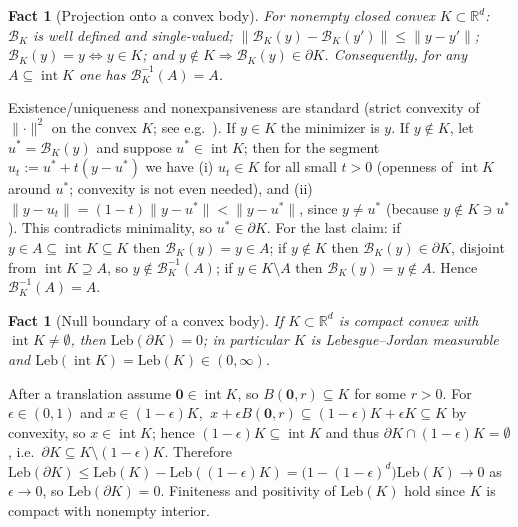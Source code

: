\documentclass[11pt]{article}
\makeatletter
\theoremstyle{definitionbreak}
\theoremstyle{plainbreak}
\newtheorem{fact}[theorem]{Fact}
\theoremstyle{remarkbreak}
\renewenvironment{proof}[1][\proofname]{\par
  \pushQED{\qed}\normalfont
  \topsep6\p@\@plus6\p@\relax
  \trivlist
  \item[\hskip\labelsep\itshape #1\@addpunct{.}]\mbox{}\par\nobreak\ignorespaces
}{\popQED\endtrivlist\@endpefalse}
\newcommand{\R}{\mathbb{R}}
\newcommand{\Leb}{\mathrm{Leb}}
\DeclareMathOperator{\intr}{int}
\newcommand{\norm}[1]{\lVert #1 \rVert}
\makeatother
\begin{document}
\begin{fact}[Projection onto a convex body]
\label{fact:proj}
For nonempty closed convex $K\subset\R^d$: $\mathcal B_K$ is well defined and single-valued;
$\norm{\mathcal B_K(y)-\mathcal B_K(y')}\le\norm{y-y'}$; $\mathcal B_K(y)=y\iff y\in K$; and
$y\notin K\Rightarrow\mathcal B_K(y)\in\partial K$. Consequently, for any $A\subseteq\intr K$ one has
$\mathcal B_K^{-1}(A)=A$.
\end{fact}
\begin{proof}
Existence/uniqueness and nonexpansiveness are standard (strict convexity of $\norm{\cdot}^2$ on the
convex $K$; see e.g.\ \cite[Ch.~III]{HiriartLemarechal}). If $y\in K$ the minimizer is $y$. If
$y\notin K$, let $u^\ast=\mathcal B_K(y)$ and suppose $u^\ast\in\intr K$; then for the segment
$u_t:=u^\ast+t(y-u^\ast)$ we have (i) $u_t\in K$ for all small $t>0$ (openness of $\intr K$ around
$u^\ast$; convexity is not even needed), and (ii)
$\norm{y-u_t}=(1-t)\norm{y-u^\ast}<\norm{y-u^\ast}$, since $y\neq u^\ast$ (because $y\notin K\ni u^\ast$).
This contradicts minimality, so $u^\ast\in\partial K$. For the last claim:
if $y\in A\subseteq\intr K\subseteq K$ then $\mathcal B_K(y)=y\in A$; if $y\notin K$ then
$\mathcal B_K(y)\in\partial K$, disjoint from $\intr K\supseteq A$, so $y\notin\mathcal B_K^{-1}(A)$;
if $y\in K\setminus A$ then $\mathcal B_K(y)=y\notin A$. Hence $\mathcal B_K^{-1}(A)=A$.
\end{proof}

\begin{fact}[Null boundary of a convex body]
\label{fact:nullbdry}
If $K\subset\R^d$ is compact convex with $\intr K\neq\emptyset$, then $\Leb(\partial K)=0$; in
particular $K$ is Lebesgue--Jordan measurable and $\Leb(\intr K)=\Leb(K)\in(0,\infty)$.
\end{fact}
\begin{proof}
After a translation assume $\bm 0\in\intr K$, so $B(\bm0,r)\subseteq K$ for some $r>0$. For
$\epsilon\in(0,1)$ and $x\in(1-\epsilon)K$, $\ x+\epsilon B(\bm0,r)\subseteq(1-\epsilon)K+\epsilon K\subseteq K$
by convexity, so $x\in\intr K$; hence $(1-\epsilon)K\subseteq\intr K$ and thus
$\partial K\cap(1-\epsilon)K=\emptyset$, i.e.\ $\partial K\subseteq K\setminus(1-\epsilon)K$.
Therefore $\Leb(\partial K)\le\Leb(K)-\Leb((1-\epsilon)K)=\big(1-(1-\epsilon)^d\big)\Leb(K)\to0$ as
$\epsilon\to0$, so $\Leb(\partial K)=0$. Finiteness and positivity of $\Leb(K)$ hold since $K$ is
compact with nonempty interior.
\end{proof}
\end{document}
